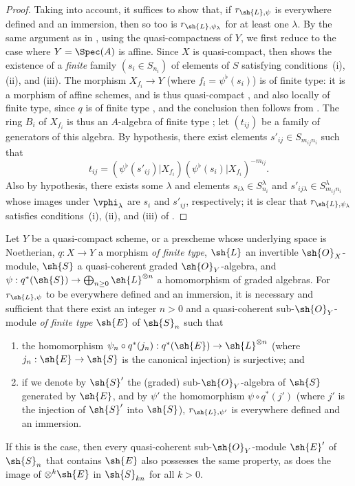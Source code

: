 \begin{proof}
Taking  into account, it suffices to show that, if $r_{\sh{L},\psi}$ is everywhere defined and an immersion, then so too is $r_{\sh{L},\psi_\lambda}$ for at least one $\lambda$.
By the same argument as in , using the quasi-compactness of $Y$, we first reduce to the case where $Y=\Spec(A)$ is affine.
Since $X$ is quasi-compact,  then shows the existence of a \emph{finite} family $(s_i\in S_{n_i})$ of elements of $S$ satisfying conditions~(i), (ii), and (iii).
The morphism $X_{f_i}\to Y$ (where $f_i=\psi^\flat(s_i)$) is of finite type: it is a morphism of affine schemes, and is thus quasi-compact , and also locally of finite type, since $q$ is of finite type , and the conclusion then follows from .
The ring $B_i$ of $X_{f_i}$ is thus an $A$-algebra of finite type ;
let $(t_{ij})$ be a family of generators of this algebra.
By hypothesis, there exist elements $s'_{ij}\in S_{m_{ij}n_i}$ such that
\[
  t_{ij} = (\psi^\flat(s'_{ij})|X_{f_i})(\psi^\flat(s_i)|X_{f_i})^{-m_{ij}}.
\]
Also by hypothesis, there exists some $\lambda$ and elements $s_{i\lambda}\in S_{n_i}^\lambda$ and $s'_{ij\lambda}\in S_{m_{ij}n_i}^\lambda$ whose images under $\vphi_\lambda$ are $s_i$ and $s'_{ij}$, respectively;
it is clear that $r_{\sh{L},\psi_\lambda}$ satisfies conditions~(i), (ii), and (iii) of .
\end{proof}

\begin{proposition}[3.8.5]
\label{II.3.8.5}
Let $Y$ be a quasi-compact scheme, or a prescheme whose underlying space is Noetherian, $q:X\to Y$ a morphism \emph{of finite type}, $\sh{L}$ an invertible $\sh{O}_X$-module, $\sh{S}$ a quasi-coherent graded $\sh{O}_Y$-algebra, and $\psi:q^*(\sh{S})\to\bigoplus_{n\geq0}\sh{L}^{\otimes n}$ a homomorphism of graded algebras.
For $r_{\sh{L},\psi}$ to be everywhere defined and an immersion, it is necessary and sufficient that there exist an integer $n>0$ and a quasi-coherent sub-$\sh{O}_Y$-module \emph{of finite type} $\sh{E}$ of $\sh{S}_n$ such that
\begin{enumerate}
  \item[a)] the homomorphism $\psi_n\circ q^*(j_n):q^*(\sh{E})\to\sh{L}^{\otimes n}$ (where $j_n:\sh{E}\to\sh{S}$ is the canonical injection) is surjective; and
  \item[b)] if we denote by $\sh{S}'$ the (graded) sub-$\sh{O}_Y$-algebra of $\sh{S}$ generated by $\sh{E}$, and by $\psi'$ the homomorphism $\psi\circ q^*(j')$ (where $j'$ is the injection of $\sh{S}'$ into $\sh{S}$), $r_{\sh{L},\psi'}$ is everywhere defined and an immersion.
\end{enumerate}

If this is the case, then every quasi-coherent sub-$\sh{O}_Y$-module $\sh{E}'$ of $\sh{S}_n$ that contains $\sh{E}$ also possesses the same property, as does the image of $\otimes^k\sh{E}$ in $\sh{S}_{kn}$ for all $k>0$.
\end{proposition}

